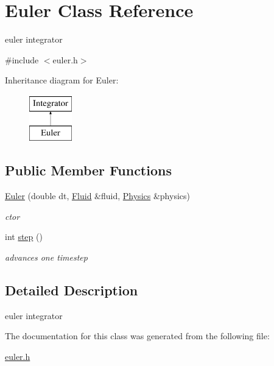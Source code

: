 \hypertarget{classEuler}{\section{\-Euler \-Class \-Reference}
\label{classEuler}
}


euler integrator  




{\ttfamily \#include $<$euler.\-h$>$}

\-Inheritance diagram for \-Euler\-:\begin{figure}[H]
\begin{center}
\leavevmode
\includegraphics[height=2.000000cm]{classEuler}
\end{center}
\end{figure}
\subsection*{\-Public \-Member \-Functions}
\begin{DoxyCompactItemize}
\item 
\hypertarget{classEuler_abae73a2536cea422aab8e6d637b766d7}{\hyperlink{classEuler_abae73a2536cea422aab8e6d637b766d7}{\-Euler} (double dt, \hyperlink{classFluid}{\-Fluid} \&fluid, \hyperlink{classPhysics}{\-Physics} \&physics)}\label{classEuler_abae73a2536cea422aab8e6d637b766d7}

\begin{DoxyCompactList}\small\item\em ctor \end{DoxyCompactList}\item 
\hypertarget{classEuler_a343d589f62a1073886e76c82e0689aed}{int \hyperlink{classEuler_a343d589f62a1073886e76c82e0689aed}{step} ()}\label{classEuler_a343d589f62a1073886e76c82e0689aed}

\begin{DoxyCompactList}\small\item\em advances one timestep \end{DoxyCompactList}\end{DoxyCompactItemize}


\subsection{\-Detailed \-Description}
euler integrator 

\-The documentation for this class was generated from the following file\-:\begin{DoxyCompactItemize}
\item 
\hyperlink{euler_8h}{euler.\-h}\end{DoxyCompactItemize}
